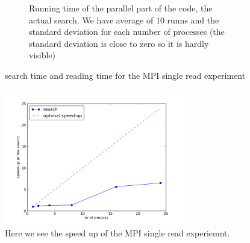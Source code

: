 \documentclass[a4paper,10pt]{article}
\begin{document}
\begin{figure}[h!t]
\begin{subfigure}[b]{0.70\textwidth}
                \caption{Running time of the parallel part of the code, the actual search. 
                         We have average of 10 runns and the standard deviation for each number
                         of processes (the standard deviation is close to zero so it is hardly 
                         visible)}
                \label{fig:mpisr_search}
        \end{subfigure}
        \caption{search time and reading time for the MPI single read experiment}
\end{figure}


\begin{figure}[htb]
  \centering
  \includegraphics[width=0.7\textwidth]{graphics/mpi2gb_single_reader/search_speedup.png}
  \caption{Here we see the speed up of the MPI single read experiemnt.}
  \label{fig:mpisr_speedup}
\end{figure}
\end{document}
